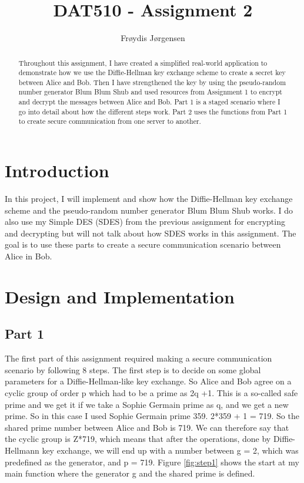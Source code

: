 \documentclass[12pt, letterpaper]{article}
\title{DAT510 - Assignment 2}
\author{Fr\o ydis J\o rgensen}
\begin{document}
\begin{titlepage}
\maketitle
\end{titlepage}

\begin{abstract}
Throughout this assignment, I have created a simplified real-world application to demonstrate how we use the Diffie-Hellman key exchange scheme to create a secret key between Alice and Bob. Then I have strengthened the key by using the pseudo-random number generator Blum Blum Shub and used resources from Assignment 1 to encrypt and decrypt the messages between Alice and Bob. Part 1 is a staged scenario where I go into detail about how the different steps work. Part 2 uses the functions from Part 1 to create secure communication from one server to another.
\end{abstract}

\section*{Introduction}
In this project, I will implement and show how the Diffie-Hellman key exchange scheme and the pseudo-random number generator Blum Blum Shub works.  I do also use my Simple DES (SDES) from the previous assignment for encrypting and decrypting but will not talk about how SDES works in this assignment. The goal is to use these parts to create a secure communication scenario between Alice in Bob.

\section*{Design and Implementation}
\subsection*{Part 1}
The first part of this assignment required making a secure communication scenario by following 8 steps.
The first step is to decide on some global parameters for a Diffie-Hellman-like key exchange. So Alice and Bob agree on a cyclic group of order p which had to be a prime as 2q +1. This is a so-called safe prime and we get it if we take a Sophie Germain prime as q, and we get a new prime. So in this case I used Sophie Germain prime 359. 2*359 + 1 = 719. So the shared prime number between Alice and Bob is 719. We can therefore say that the cyclic group is Z*719, which means that after the operations, done by Diffie-Hellmann key exchange, we will end up with a number between g = 2, which was predefined as the generator, and p = 719. Figure \ref{fig:step1} shows the start at my main function where the generator g and the shared prime is defined.
\end{document}
